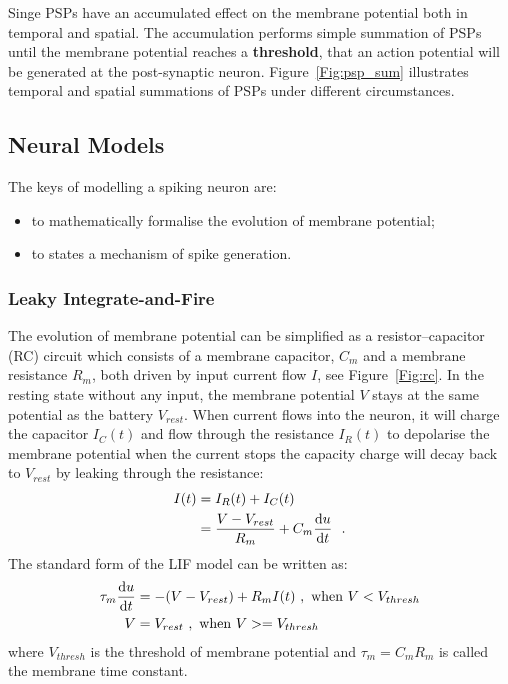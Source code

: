 Singe PSPs have an accumulated effect on the membrane potential both in temporal and spatial.
The accumulation performs simple summation of PSPs until the membrane potential reaches a \textbf{threshold}, that an action potential will be generated at the post-synaptic neuron.
Figure~\ref{Fig:psp_sum} illustrates temporal and spatial summations of PSPs under different circumstances.




\subsection{Neural Models}
The keys of modelling a spiking neuron are: 
\begin{itemize}
	\item to mathematically formalise the evolution of membrane potential;
	\item to states a mechanism of spike generation.
\end{itemize}

\subsubsection{Leaky Integrate-and-Fire}
The evolution of membrane potential can be simplified as a resistor–capacitor (RC) circuit which consists of a membrane capacitor, $C_m$ and a membrane resistance $R_m$, both driven by input current flow $I$, see Figure~\ref{Fig:rc}.
In the resting state without any input, the membrane potential $V$ stays at the same potential as the battery $V_{rest}$.
When current flows into the neuron, it will charge the capacitor $I_C(t)$ and flow through the resistance $I_R(t)$ to depolarise the membrane potential when the current stops the capacity charge will decay back to $V_{rest}$ by leaking through the resistance:
\begin{equation}
\begin{aligned}
	I(t) &= I_R(t) + I_C(t) \\
	&= \frac{V-V_{rest}}{R_m} + C_m \frac{\mathrm{d} u}{\mathrm{d} t}~~.
\end{aligned}
\end{equation}
The standard form of the LIF model can be written as:
\begin{equation}
\begin{aligned}
	\tau_m \frac{\mathrm{d} u}{\mathrm{d} t} &= -(V-V_{rest}) + R_m I(t)~, \textrm{~when~} V<V_{thresh}\\
	V &= V_{rest}~,  \textrm{~when~} V>=V_{thresh}
\end{aligned}
\end{equation}
where $V_{thresh}$ is the threshold of membrane potential and $\tau_m = C_m R_m$ is called the membrane time constant.


